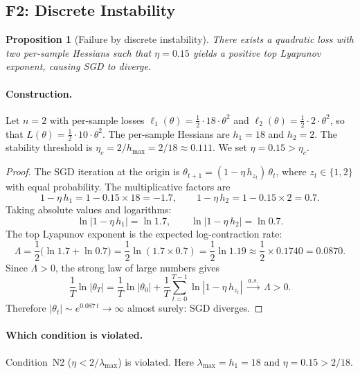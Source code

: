 \documentclass[11pt,a4paper]{article}
\newtheorem{proposition}[theorem]{Proposition}
\begin{document}
\subsection{F2: Discrete Instability}
\label{sec:f2}

\begin{proposition}[Failure by discrete instability]
\label{prop:f2}
There exists a quadratic loss with two per-sample Hessians such that
$\eta = 0.15$ yields a positive top Lyapunov exponent, causing SGD to diverge.
\end{proposition}

\paragraph{Construction.}
Let $n=2$ with per-sample losses $\ell_1(\theta)=\frac{1}{2}\cdot 18\cdot\theta^2$
and $\ell_2(\theta)=\frac{1}{2}\cdot 2\cdot\theta^2$, so that
$L(\theta) = \frac{1}{2}\cdot 10\cdot\theta^2$.
The per-sample Hessians are $h_1 = 18$ and $h_2 = 2$.
The stability threshold is $\eta_c = 2/h_{\max} = 2/18 \approx 0.111$.
We set $\eta = 0.15 > \eta_c$.

\begin{proof}
The SGD iteration at the origin is $\theta_{t+1} = (1 - \eta\,h_{z_t})\,\theta_t$,
where $z_t\in\{1,2\}$ with equal probability.  The multiplicative factors are
\[
  1 - \eta\, h_1 = 1 - 0.15\times 18 = -1.7,
  \qquad
  1 - \eta\, h_2 = 1 - 0.15\times 2 = 0.7.
\]
Taking absolute values and logarithms:
\[
  \ln|1-\eta\,h_1| = \ln 1.7,
  \qquad
  \ln|1-\eta\,h_2| = \ln 0.7.
\]
The top Lyapunov exponent is the expected log-contraction rate:
\[
  \Lambda
  = \frac{1}{2}\bigl(\ln 1.7 + \ln 0.7\bigr)
  = \frac{1}{2}\ln(1.7\times 0.7)
  = \frac{1}{2}\ln 1.19
  \approx \frac{1}{2}\times 0.1740
  = 0.0870.
\]
Since $\Lambda > 0$, the strong law of large numbers gives
\[
  \frac{1}{T}\ln|\theta_T|
  = \frac{1}{T}\ln|\theta_0| + \frac{1}{T}\sum_{t=0}^{T-1}\ln|1-\eta\,h_{z_t}|
  \;\xrightarrow{a.s.}\; \Lambda > 0.
\]
Therefore $|\theta_t| \sim e^{0.087\,t} \to \infty$ almost surely: SGD diverges.
\end{proof}

\paragraph{Which condition is violated.}
Condition~N2 ($\eta < 2/\lambda_{\max}$) is violated.
Here $\lambda_{\max} = h_1 = 18$ and $\eta = 0.15 > 2/18$.
\end{document}
